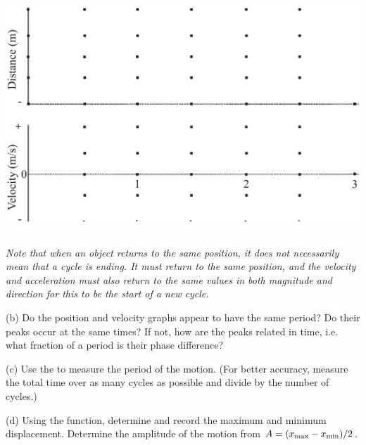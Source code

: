 \begin{center}
\includegraphics[height=3.5in]{periodic_motion/periodic_motion_fig1_new.eps}
\end{center}

\textit{Note that when an object returns to the same position, it 
does not necessarily mean that a cycle is ending. It must return to the same 
position, and the velocity and acceleration must also return to the same 
values in both magnitude and direction for this to be the start of a new cycle.}


(b) Do the position and velocity graphs appear to have the same period? Do their
peaks occur at the same times? If not, how are the peaks related in time, i.e. 
what fraction of a period is their phase difference?
\vspace{20mm}

(c) Use the  to measure the period of the motion. (For
better accuracy, measure the total time over as many cycles as possible and
divide by the number of cycles.)
\vspace{20mm}

(d) Using the  function, determine and record the maximum and minimum 
displacement.  Determine the amplitude of the motion from $A = (x_{\rm max} - x_{\rm min})/2$.
\vspace{20mm}

